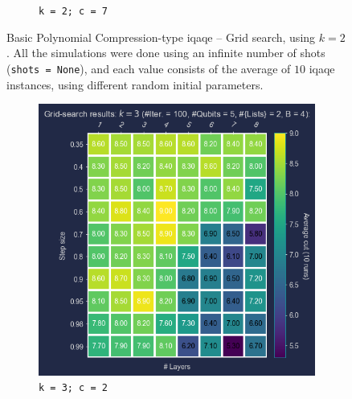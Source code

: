 \begin{figure}[ht!]
\begin{subfigure}[b]{0.325\textwidth}
      \caption{\texttt{k = 2; c = 7}}
      \label{fig:k=2;c=7}
  \end{subfigure}
  \caption{Basic Polynomial Compression-type \acrshort{iqaqe} – Grid search, using $k=2$. All the simulations were done using an infinite number of shots (\texttt{shots = None}), and each value consists of the average of $10$ \acrshort{iqaqe} instances, using different random initial parameters.}
  \label{fig:k=2}
\end{figure}

\begin{figure}[ht!]
  \centering
  \begin{subfigure}[b]{0.475\textwidth}
      \centering
      \includegraphics[width=1\textwidth]{Figures/Chapter_5/k=3(Grid_search)/iQAQE_k3_Grid_Search_step_size_n_layers_c=2.png}
      \caption{\texttt{k = 3; c = 2}}
      \label{fig:k=3;c=2}
  \end{subfigure}
  \hfill
  \begin{subfigure}[b]{0.475\textwidth}
      \centering

\end{subfigure}
\end{figure}
